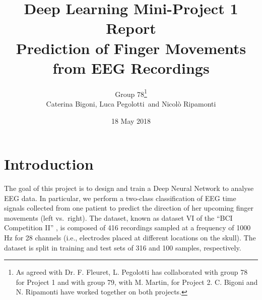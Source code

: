 \documentclass{article}
\begin{document}
\title{Deep Learning Mini-Project 1 Report \\ Prediction of Finger Movements from EEG Recordings}

\author{Group 78\footnote{As agreed with Dr. F. Fleuret, L. Pegolotti has collaborated with group 78 for Project 1 and with group 79, with M. Martin, for Project 2. C. Bigoni and N. Ripamonti have worked together on both projects.}\\ Caterina Bigoni, Luca Pegolotti \,and Nicol\`o Ripamonti}
\date{18 May 2018}
\maketitle




\section{Introduction}
 The goal of this project is to design and train a Deep Neural Network to analyse EEG data. 
 In particular, we perform a two-class classification of EEG time signals collected from one patient to predict the direction of her upcoming finger movements (left vs.\ right). 
 The  dataset,  known as dataset VI  of the ``BCI Competition II'' \cite{bci_ii}, is composed of 416 recordings  sampled at  a  frequency of 1000 Hz for 28 channels (i.e., electrodes placed at different locations on the skull).
The dataset is split in training and test sets of 316 and 100 samples, respectively. 

\end{document}
